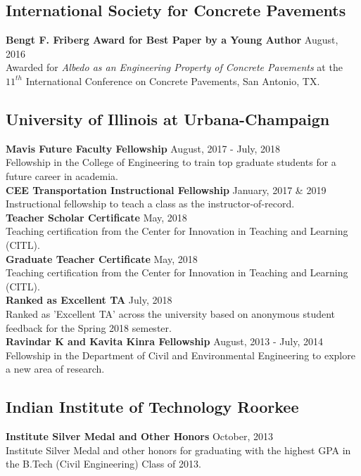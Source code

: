 \documentclass[12pt]{article}
\begin{document}
\subsection*{International Society for Concrete Pavements}
\textbf{Bengt F. Friberg Award for Best Paper by a Young Author} \hfill August, 2016 \\
Awarded for \textit{Albedo as an Engineering Property of Concrete Pavements} at the $11^{th}$ International Conference on Concrete Pavements, San Antonio, TX. \\

\subsection*{University of Illinois at Urbana-Champaign} 
\textbf{Mavis Future Faculty Fellowship} \hfill August, 2017 - July, 2018 \\
Fellowship in the College of Engineering to train top graduate students for a future career in academia. \\

\textbf{CEE Transportation Instructional Fellowship} \hfill January, 2017 \& 2019 \\
Instructional fellowship to teach a class as the instructor-of-record. \\

\textbf{Teacher Scholar Certificate} \hfill May, 2018 \\
Teaching certification from the Center for Innovation in Teaching and Learning (CITL). \\

\textbf{Graduate Teacher Certificate} \hfill May, 2018 \\
Teaching certification from the Center for Innovation in Teaching and Learning (CITL). \\

\textbf{Ranked as Excellent TA} \hfill July, 2018 \\
Ranked as 'Excellent TA' across the university based on anonymous student feedback for the Spring 2018 semester. \\

\textbf{Ravindar K and Kavita Kinra Fellowship} \hfill August, 2013 - July, 2014 \\
Fellowship in the Department of Civil and Environmental Engineering to explore a new area of research. \\


\subsection*{Indian Institute of Technology Roorkee} 
\textbf{Institute Silver Medal and Other Honors} \hfill October, 2013 \\
Institute Silver Medal and other honors for graduating with the highest GPA in the B.Tech (Civil Engineering) Class of 2013. \\
\end{document}

